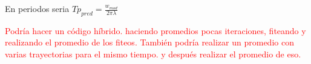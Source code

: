 	 En periodos seria $Tp_{pred}=\frac{w_{mod}}{2\pi\lambda}$
	 
	 \textcolor{red}{Podría hacer un código híbrido. haciendo promedios pocas iteraciones, fiteando y realizando el promedio de los fiteos. También podría realizar un promedio con varias trayectorias para el mismo tiempo. y después realizar el promedio de eso. }
	
%	
%	



%
%
%
